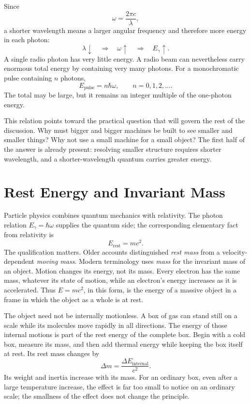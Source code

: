 Since
\begin{equation}
\omega=\frac{2\pi c}{\lambda},
\end{equation}
a shorter wavelength means a larger angular frequency and therefore more energy in each photon:
\begin{equation}
\lambda\downarrow
\quad\Longrightarrow\quad
\omega\uparrow
\quad\Longrightarrow\quad
E_\gamma\uparrow.
\end{equation}
A single radio photon has very little energy. A radio beam can nevertheless carry enormous total energy by containing very many photons. For a monochromatic pulse containing \(n\) photons,
\begin{equation}
E_{\text{pulse}}=n\hbar\omega,
\qquad
n=0,1,2,\ldots.
\end{equation}
The total may be large, but it remains an integer multiple of the one-photon energy.

This relation points toward the practical question that will govern the rest of the discussion. Why must bigger and bigger machines be built to see smaller and smaller things? Why not use a small machine for a small object? The first half of the answer is already present: resolving smaller structure requires shorter wavelength, and a shorter-wavelength quantum carries greater energy.

\section{Rest Energy and Invariant Mass}

Particle physics combines quantum mechanics with relativity. The photon relation \(E_\gamma=\hbar\omega\) supplies the quantum side; the corresponding elementary fact from relativity is
\begin{equation}
E_{\mathrm{rest}}=mc^2.
\end{equation}
The qualification matters. Older accounts distinguished \emph{rest mass} from a velocity-dependent \emph{moving mass}. Modern terminology uses \emph{mass} for the invariant mass of an object. Motion changes its energy, not its mass. Every electron has the same mass, whatever its state of motion, while an electron's energy increases as it is accelerated. Thus \(E=mc^2\), in this form, is the energy of a massive object in a frame in which the object as a whole is at rest.

The object need not be internally motionless. A box of gas can stand still on a scale while its molecules move rapidly in all directions. The energy of those internal motions is part of the rest energy of the complete box. Begin with a cold box, measure its mass, and then add thermal energy while keeping the box itself at rest. Its rest mass changes by
\begin{equation}
\Delta m=\frac{\Delta E_{\mathrm{internal}}}{c^2}.
\end{equation}
Its weight and inertia increase with its mass. For an ordinary box, even after a large temperature increase, the effect is far too small to notice on an ordinary scale; the smallness of the effect does not change the principle.

